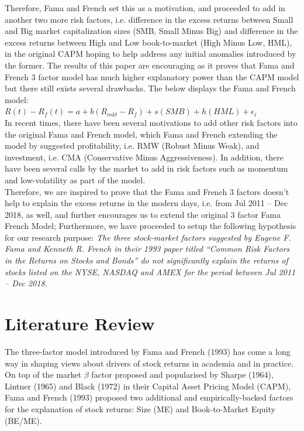 \documentclass[12pt]{article}
\begin{document}
	\noindent Therefore, Fama and French set this as a motivation, and proceeded to add in another two more risk factors, i.e. difference in the excess returns between Small and Big market capitalization sizes (SMB, Small Minus Big) and difference in the excess returns between High and Low book-to-market (High Minus Low, HML), in the original CAPM hoping to help address any initial anomalies introduced by the former. The results of this paper are encouraging as it proves that Fama and French 3 factor model has much higher explanatory power than the CAPM model but there still exists several drawbacks. The below displays the Fama and French model: \\
	
	\noindent $R(t) - R_f(t) = a+ b(R_{mkt} - R_f) + s(SMB) + h(HML) +\epsilon_i$ \\
	
	
	\noindent In recent times, there have been several motivations to add other risk factors into the original Fama and French model, which Fama and French extending the model by suggested profitability, i.e. RMW (Robust Minus Weak), and investment, i.e. CMA (Conservative Minus Aggressiveness). In addition, there have been several calls by the market to add in risk factors such as momentum and low-volatility as part of the model. \\
	
	\noindent Therefore, we are inspired to prove that the Fama and French 3 factors doesn’t help to explain the excess returns in the modern days, i.e. from Jul 2011 – Dec 2018, as well, and further encourages us to extend the original 3 factor Fama French Model; Furthermore, we have proceeded to setup the following hypothesis for our research purpose: {\textit{The three stock-market factors suggested by Eugene F. Fama and Kenneth R. French in their 1993 paper titled “Common Risk Factors in the Returns on Stocks and Bonds” do not significantly explain the returns of stocks listed on the NYSE, NASDAQ and AMEX for the period between Jul 2011 – Dec 2018.}}
	
	
	\section{Literature Review} %
	
	The three-factor model introduced by Fama and French (1993) has come a long way in shaping views about drivers of stock returns in academia and in practice. On top of the market $\beta$ factor proposed and popularised by Sharpe (1964), Lintner (1965) and Black (1972) in their Capital Asset Pricing Model (CAPM), Fama and French (1993) proposed two additional and empirically-backed factors for the explanation of stock returns: Size (ME) and Book-to-Market Equity (BE/ME). \\
	
\end{document}
